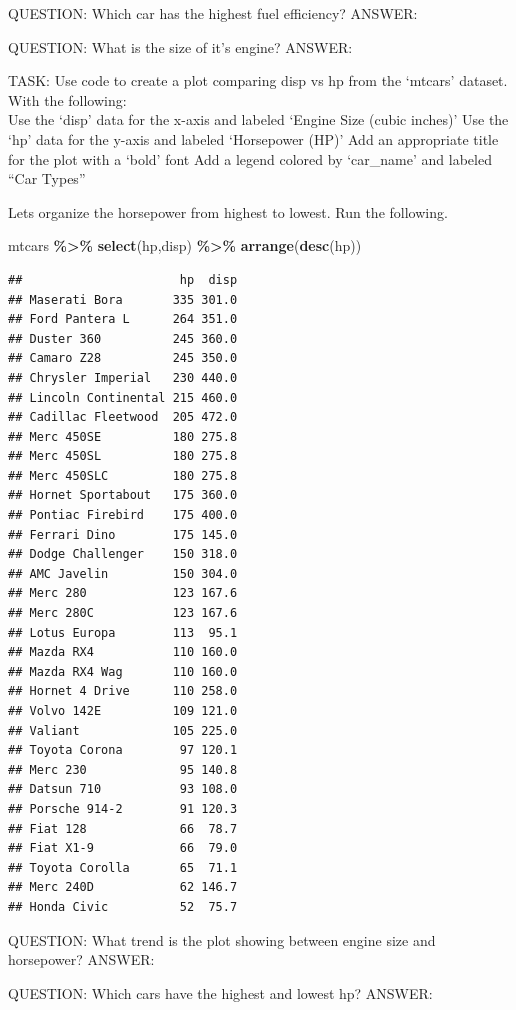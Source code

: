 \documentclass[
]{article}
\newenvironment{Shaded}{\begin{snugshade}}{\end{snugshade}}
\newcommand{\FunctionTok}[1]{\textcolor[rgb]{0.13,0.29,0.53}{\textbf{#1}}}
\newcommand{\NormalTok}[1]{#1}
\newcommand{\SpecialCharTok}[1]{\textcolor[rgb]{0.81,0.36,0.00}{\textbf{#1}}}
\begin{document}
QUESTION: Which car has the highest fuel efficiency? ANSWER:

QUESTION: What is the size of it's engine? ANSWER:

TASK: Use code to create a plot comparing disp vs hp from the `mtcars'
dataset. With the following:\\
Use the `disp' data for the x-axis and labeled `Engine Size (cubic
inches)' Use the `hp' data for the y-axis and labeled `Horsepower (HP)'
Add an appropriate title for the plot with a `bold' font Add a legend
colored by `car\_name' and labeled ``Car Types''

Lets organize the horsepower from highest to lowest. Run the following.

\begin{Shaded}
\begin{Highlighting}[]
\NormalTok{mtcars }\SpecialCharTok{\%\textgreater{}\%}
  \FunctionTok{select}\NormalTok{(hp,disp) }\SpecialCharTok{\%\textgreater{}\%} 
  \FunctionTok{arrange}\NormalTok{(}\FunctionTok{desc}\NormalTok{(hp))}
\end{Highlighting}
\end{Shaded}

\begin{verbatim}
##                      hp  disp
## Maserati Bora       335 301.0
## Ford Pantera L      264 351.0
## Duster 360          245 360.0
## Camaro Z28          245 350.0
## Chrysler Imperial   230 440.0
## Lincoln Continental 215 460.0
## Cadillac Fleetwood  205 472.0
## Merc 450SE          180 275.8
## Merc 450SL          180 275.8
## Merc 450SLC         180 275.8
## Hornet Sportabout   175 360.0
## Pontiac Firebird    175 400.0
## Ferrari Dino        175 145.0
## Dodge Challenger    150 318.0
## AMC Javelin         150 304.0
## Merc 280            123 167.6
## Merc 280C           123 167.6
## Lotus Europa        113  95.1
## Mazda RX4           110 160.0
## Mazda RX4 Wag       110 160.0
## Hornet 4 Drive      110 258.0
## Volvo 142E          109 121.0
## Valiant             105 225.0
## Toyota Corona        97 120.1
## Merc 230             95 140.8
## Datsun 710           93 108.0
## Porsche 914-2        91 120.3
## Fiat 128             66  78.7
## Fiat X1-9            66  79.0
## Toyota Corolla       65  71.1
## Merc 240D            62 146.7
## Honda Civic          52  75.7
\end{verbatim}

QUESTION: What trend is the plot showing between engine size and
horsepower? ANSWER:

QUESTION: Which cars have the highest and lowest hp? ANSWER:
\end{document}
